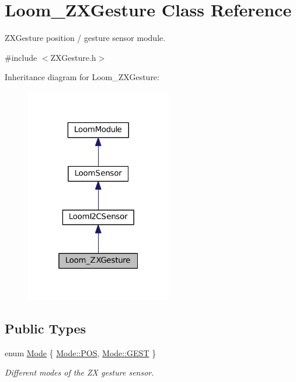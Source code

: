 \hypertarget{class_loom___z_x_gesture}{}\section{Loom\+\_\+\+Z\+X\+Gesture Class Reference}
\label{class_loom___z_x_gesture}


Z\+X\+Gesture position / gesture sensor module.  




{\ttfamily \#include $<$Z\+X\+Gesture.\+h$>$}



Inheritance diagram for Loom\+\_\+\+Z\+X\+Gesture\+:\nopagebreak
\begin{figure}[H]
\begin{center}
\leavevmode
\includegraphics[width=181pt]{class_loom___z_x_gesture__inherit__graph}
\end{center}
\end{figure}
\subsection*{Public Types}
\begin{DoxyCompactItemize}
\item 
enum \hyperlink{class_loom___z_x_gesture_a4c381d3f296be2cac6188fd8c5f8b7dd}{Mode} \{ \hyperlink{class_loom___z_x_gesture_a4c381d3f296be2cac6188fd8c5f8b7dda1903f54cd46d54aa3200a4508c948db0}{Mode\+::\+P\+OS}, 
\hyperlink{class_loom___z_x_gesture_a4c381d3f296be2cac6188fd8c5f8b7dda503fb1a567801586b5eddc16753a3772}{Mode\+::\+G\+E\+ST}
 \}\begin{DoxyCompactList}\small\item\em Different modes of the ZX gesture sensor. \end{DoxyCompactList}
\end{DoxyCompactItemize}
